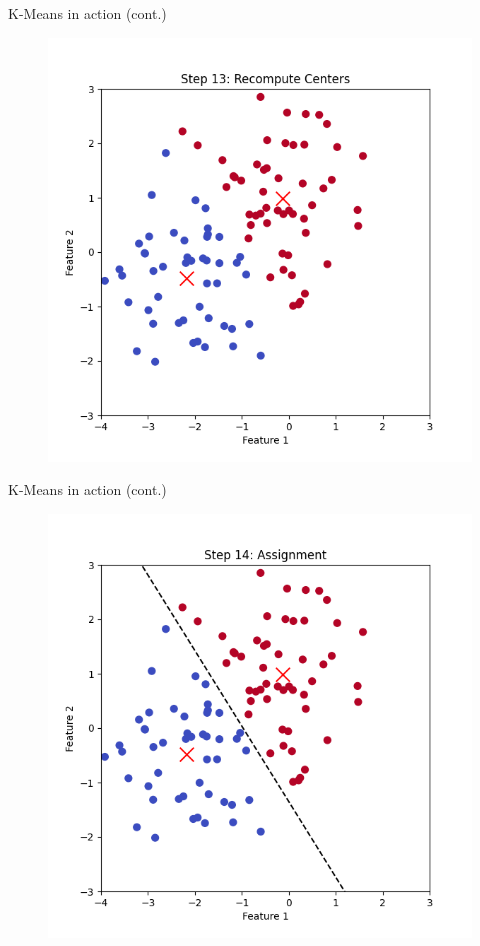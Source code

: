 \documentclass[serif, aspectratio=169]{beamer}
\begin{document}
\begin{frame}{K-Means in action (cont.)}
    \begin{figure}
        \centering
        \includegraphics[scale=0.45]{pic/figs/kmeans_step_13_recompute_centers.png}
    \end{figure}
\end{frame}
\begin{frame}{K-Means in action (cont.)}
    \begin{figure}
        \centering
        \includegraphics[scale=0.45]{pic/figs/kmeans_step_14_assignment.png}
    \end{figure}
\end{frame}
\end{document}
